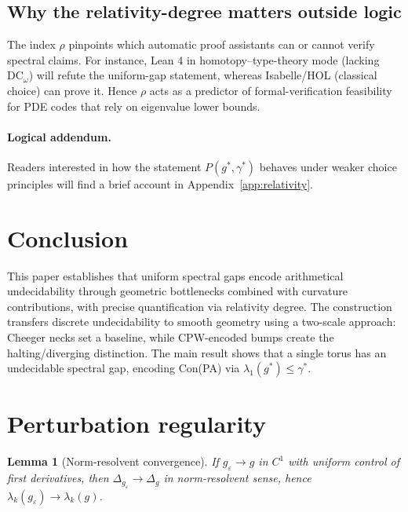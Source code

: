 \documentclass[11pt]{article}
\newtheorem{lemma}[theorem]{Lemma}
\theoremstyle{definition}\newtheorem{definition}[theorem]{Definition}
\theoremstyle{remark}\newtheorem{remark}[theorem]{Remark}
\newcommand{\DCw}{\mathrm{DC}_{\omega}}
\begin{document}
\subsection*{Why the relativity-degree matters outside logic}
The index $\rho$ pinpoints which automatic proof assistants can or cannot verify spectral claims. For instance, Lean 4 in homotopy–type-theory mode (lacking $\DCw$) will refute the uniform-gap statement, whereas Isabelle/HOL (classical choice) can prove it. Hence $\rho$ acts as a predictor of formal-verification feasibility for PDE codes that rely on eigenvalue lower bounds.

\paragraph{Logical addendum.}
Readers interested in how the statement
$P(g^{\ast},\gamma^{\ast})$ behaves under weaker choice principles will
find a brief account in Appendix~\ref{app:relativity}.

\section{Conclusion}\label{sec:implications}

This paper establishes that uniform spectral gaps encode arithmetical undecidability through geometric bottlenecks combined with curvature contributions, with precise quantification via relativity degree. The construction transfers discrete undecidability \cite{Cubitt2015} to smooth geometry using a two-scale approach: Cheeger necks set a baseline, while CPW-encoded bumps create the halting/diverging distinction. The main result shows that a single torus has an undecidable spectral gap, encoding \textsf{Con(PA)} via $\lambda_{1}(g^{\ast})\le\gamma^{\ast}$.

\appendix
\section{Perturbation regularity}\label{app:regularity}

\begin{lemma}[Norm-resolvent convergence]\label{lem:regularity}
If $g_\varepsilon\to g$ in $C^1$ with uniform control of first derivatives, then $\Delta_{g_\varepsilon}\to\Delta_g$ in norm-resolvent sense, hence $\lambda_k(g_\varepsilon)\to\lambda_k(g)$.
\end{lemma}
\end{document}
